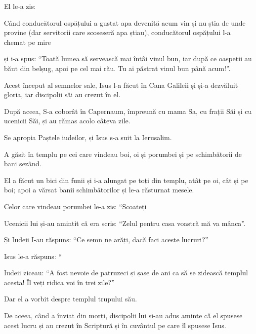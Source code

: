 {El le-a zis:
{}

Când conducătorul ospățului a gustat apa devenită acum vin și nu știa de unde provine (dar servitorii care scoseseră apa știau), conducătorul ospățului l-a chemat pe mire

și i-a spus: “Toată lumea să servească mai întâi vinul bun, iar după ce oaspeții au băut din belșug, apoi pe cel mai rău. Tu ai păstrat vinul bun până acum!”.

Acest început al semnelor sale, Isus l-a făcut în Cana Galileii și și-a dezvăluit gloria, iar discipolii săi au crezut în el.


\par }{\PP {}După aceea, S-a coborât în Capernaum, împreună cu mama Sa, cu frații Săi și cu ucenicii Săi, și au rămas acolo câteva zile.


\par }{\PP {}Se apropia Paștele iudeilor, și Isus s-a suit la Ierusalim.

A găsit în templu pe cei care vindeau boi, oi și porumbei și pe schimbătorii de bani șezând.

El a făcut un bici din funii și i-a alungat pe toți din templu, atât pe oi, cât și pe boi; apoi a vărsat banii schimbătorilor și le-a răsturnat mesele.

Celor care vindeau porumbei le-a zis: “Scoateți
{}

Ucenicii lui și-au amintit că era scris: “Zelul pentru casa voastră mă va mânca”.


\par }{\PP {}Și Iudeii I-au răspuns: “Ce semn ne arăți, dacă faci aceste lucruri?”


\par }{\PP {}Isus le-a răspuns: “{}


\par }{\PP {}Iudeii ziceau: “A fost nevoie de patruzeci și șase de ani ca să se zidească templul acesta! Îl veți ridica voi în trei zile?”

Dar el a vorbit despre templul trupului său.

De aceea, când a înviat din morți, discipolii lui și-au adus aminte că el spusese acest lucru și au crezut în Scriptură și în cuvântul pe care îl spusese Isus.


}
